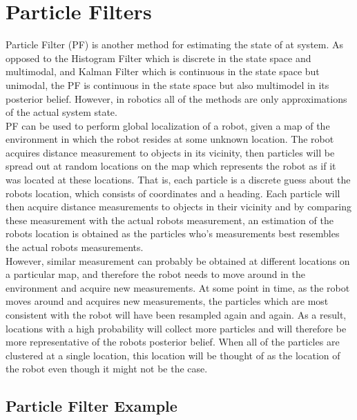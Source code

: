 
\section{Particle Filters}

Particle Filter (PF) is another method for estimating the state of at system. As opposed to the Histogram Filter which is discrete in the state space and multimodal, and Kalman Filter which is continuous in the state space but unimodal, the PF is continuous in the state space but also multimodel in its posterior belief. However, in robotics all of the methods are only approximations of the actual system state.\\

PF can be used to perform global localization of a robot, given a map of the environment in which the robot resides at some unknown location. The robot acquires distance measurement to objects in its vicinity, then particles will be spread out at random locations on the map which represents the robot as if it was located at these locations. That is, each particle is a discrete guess about the robots location, which consists of coordinates and a heading. Each particle will then acquire distance measurements to objects in their vicinity and by comparing these measurement with the actual robots measurement, an estimation of the robots location is obtained as the particles who's measurements best resembles the actual robots measurements.\\

However, similar measurement can probably be obtained at different locations on a particular map, and therefore the robot needs to move around in the environment and acquire new measurements. At some point in time, as the robot moves around and acquires new measurements, the particles which are most consistent with the robot will have been resampled again and again. As a result, locations with a high probability will collect more particles and will therefore be more representative of the robots posterior belief. When all of the particles are clustered at a single location, this location will be thought of as the location of the robot even though it might not be the case.\\

\subsection{Particle Filter Example}

